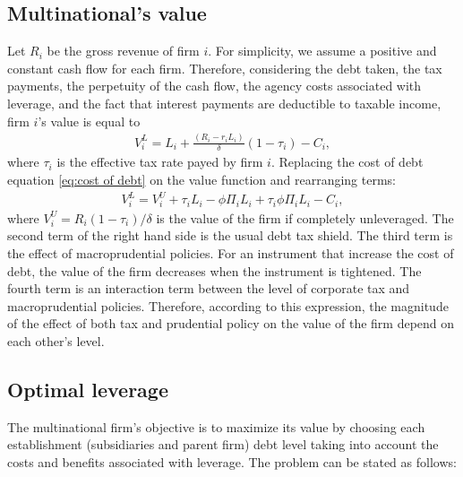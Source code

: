 \documentclass[12pt]{article}
\begin{document}
		\subsection{Multinational's value}
			 \label{subsec:value}
	Let $R_i$ be the gross revenue of firm $i$. For simplicity, we assume a positive and constant cash flow for each firm. Therefore, considering the debt taken, the tax payments, the perpetuity of the cash flow, the agency costs associated with leverage, and the fact that interest payments are deductible to taxable income, firm $i$'s value is equal to
	 \begin{equation}
	\begin{aligned}
	V_i^L=L_i+\frac{(R_i-r_iL_i)}{\delta}(1-\tau_{i})-C_i,
	\end{aligned}
	\label{eq:value 1}
	\end{equation}	
	 where $\tau_{i}$ is the effective tax rate payed by firm $i$. Replacing the cost of debt equation \ref{eq:cost of debt} on the value function \label{eq:value 2} and rearranging terms:
	  \begin{equation}
	 \begin{aligned}
	 V_i^L=V_i^U+\tau_{i}L_i-\phi\Pi_iL_i+\tau_{i}\phi\Pi_iL_i-C_i,
	 \end{aligned}
	 \label{eq:value 2}
	 \end{equation}	
	 where $V_i^U=R_i(1-\tau_{i})/\delta$ is the value of the firm if completely unleveraged. The second term of the right hand side is the usual debt tax shield. The third term is the effect of macroprudential policies. For an instrument that increase the cost of debt, the value of the firm decreases when the instrument is tightened. The fourth term is an interaction term between the level of corporate tax and macroprudential policies. Therefore, according to this expression, the magnitude of the effect of both tax and prudential policy on the value of the firm depend on each other's level. 
	 \subsection{Optimal leverage}
	 			 \label{subsec:opt_leverage}
	The multinational firm's objective is to maximize its value by choosing each establishment (subsidiaries and parent firm) debt level taking into account the costs and benefits associated with leverage. The problem can be stated as follows: 
	
\end{document}
